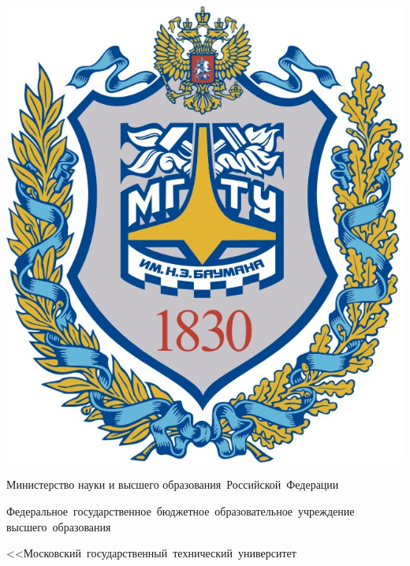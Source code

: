 \def\myname{Рунов К.А.}
\def\mygroup{ИУ7-54Б}
\def\mytheme{Разработка программного обеспечения для моделирования упругих столкновений объектов в пространстве}

\begin{titlepage}
    \fontsize{12pt}{12pt}\selectfont

    \noindent
    \begin{center}
        \begin{minipage}{0.14\textwidth}
            \includegraphics[width=\linewidth]{img/bmstu_logo.jpg}
        \end{minipage}
        \hfill
        \begin{minipage}{0.85\textwidth}\centering\bfseries
            {
                \linespread{1}\selectfont
                \vspace{0.1cm}
                {Министерство науки и высшего образования~Российской~Федерации}

                {Федеральное~государственное~бюджетное~образовательное~учреждение высшего~образования}

                {
                    <<Московский~государственный~технический~университет

}}
\end{minipage}
\end{center}
\end{titlepage}
